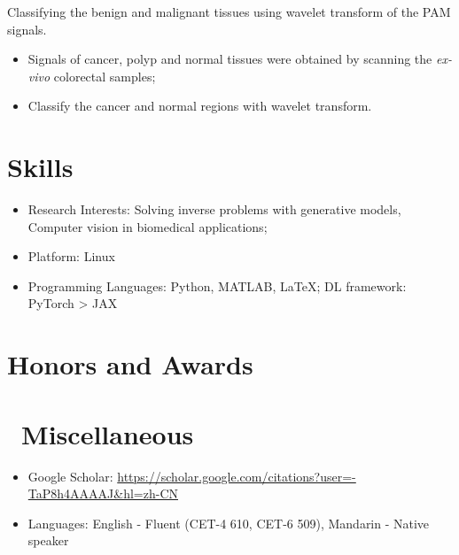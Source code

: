 \documentclass{resume}
\begin{document}
Classifying the benign and malignant tissues using wavelet transform of the PAM signals.
\begin{itemize}
  \item Signals of cancer, polyp and normal tissues were obtained by scanning the \textit{ex-vivo} colorectal samples;
  \item Classify the cancer and normal regions with wavelet transform.
\end{itemize}


\section{\faCogs\quad Skills}
\begin{itemize}[parsep=0.5ex]
    \item Research Interests: Solving inverse problems with generative models, Computer vision in biomedical applications;
    \item Platform: Linux
    \item Programming Languages: Python, MATLAB, \LaTeX{}; DL framework: PyTorch > JAX
\end{itemize}

\section{\faHeartO\quad Honors and Awards}

\section{\faInfo\quad\ Miscellaneous}
\begin{itemize}[parsep=0.5ex]
  \item Google Scholar: \url{https://scholar.google.com/citations?user=-TaP8h4AAAAJ&hl=zh-CN}
  \item Languages: English - Fluent (CET-4 610, CET-6 509), Mandarin - Native speaker
\end{itemize}

%
%
\end{document}
